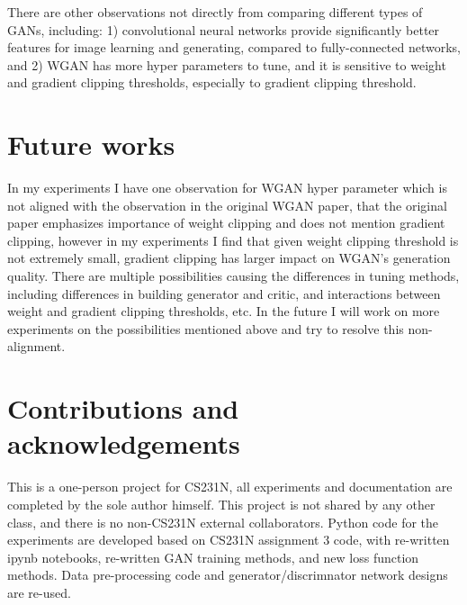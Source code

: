 \documentclass[10pt,twocolumn,letterpaper]{article}
\begin{document}
There are other observations not directly from comparing different types of GANs, including: 1) convolutional neural networks provide significantly better features for image learning and generating, compared to fully-connected networks, and 2) WGAN has more hyper parameters to tune, and it is sensitive to weight and gradient clipping thresholds, especially to gradient clipping threshold.

\section{Future works}
\label{future_works}

In my experiments I have one observation for WGAN hyper parameter which is not aligned with the observation in the original WGAN paper, that the original paper emphasizes importance of weight clipping and does not mention gradient clipping, however in my experiments I find that given weight clipping threshold is not extremely small, gradient clipping has larger impact on WGAN's generation quality. There are multiple possibilities causing the differences in tuning methods, including differences in building generator and critic, and interactions between weight and gradient clipping thresholds, etc. In the future I will work on more experiments on the possibilities mentioned above and try to resolve this non-alignment.

\section{Contributions and acknowledgements}
\label{acknowledgements}

This is a one-person project for CS231N, all experiments and documentation are completed by the sole author himself. This project is not shared by any other class, and there is no non-CS231N external collaborators. Python code for the experiments are developed based on CS231N assignment 3 code, with re-written ipynb notebooks, re-written GAN training methods, and new loss function methods. Data pre-processing code and generator/discrimnator network designs are re-used.
\end{document}
